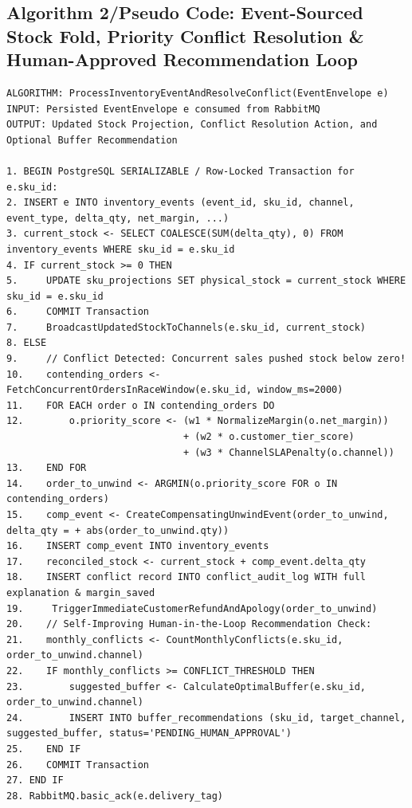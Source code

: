 \documentclass[oneside,a4paper,12pt]{report}
\begin{document}
\subsection{Algorithm 2/Pseudo Code: Event-Sourced Stock Fold, Priority Conflict Resolution \& Human-Approved Recommendation Loop}
\begin{lstlisting}[caption={Algorithm 2: Priority Conflict Resolution and Evidence-Based Buffer Advisor (Python + PostgreSQL)}]
ALGORITHM: ProcessInventoryEventAndResolveConflict(EventEnvelope e)
INPUT: Persisted EventEnvelope e consumed from RabbitMQ
OUTPUT: Updated Stock Projection, Conflict Resolution Action, and Optional Buffer Recommendation

1. BEGIN PostgreSQL SERIALIZABLE / Row-Locked Transaction for e.sku_id:
2. INSERT e INTO inventory_events (event_id, sku_id, channel, event_type, delta_qty, net_margin, ...)
3. current_stock <- SELECT COALESCE(SUM(delta_qty), 0) FROM inventory_events WHERE sku_id = e.sku_id
4. IF current_stock >= 0 THEN
5.     UPDATE sku_projections SET physical_stock = current_stock WHERE sku_id = e.sku_id
6.     COMMIT Transaction
7.     BroadcastUpdatedStockToChannels(e.sku_id, current_stock)
8. ELSE
9.     // Conflict Detected: Concurrent sales pushed stock below zero!
10.    contending_orders <- FetchConcurrentOrdersInRaceWindow(e.sku_id, window_ms=2000)
11.    FOR EACH order o IN contending_orders DO
12.        o.priority_score <- (w1 * NormalizeMargin(o.net_margin))
                               + (w2 * o.customer_tier_score)
                               + (w3 * ChannelSLAPenalty(o.channel))
13.    END FOR
14.    order_to_unwind <- ARGMIN(o.priority_score FOR o IN contending_orders)
15.    comp_event <- CreateCompensatingUnwindEvent(order_to_unwind, delta_qty = + abs(order_to_unwind.qty))
16.    INSERT comp_event INTO inventory_events
17.    reconciled_stock <- current_stock + comp_event.delta_qty
18.    INSERT conflict record INTO conflict_audit_log WITH full explanation & margin_saved
19.     TriggerImmediateCustomerRefundAndApology(order_to_unwind)
20.    // Self-Improving Human-in-the-Loop Recommendation Check:
21.    monthly_conflicts <- CountMonthlyConflicts(e.sku_id, order_to_unwind.channel)
22.    IF monthly_conflicts >= CONFLICT_THRESHOLD THEN
23.        suggested_buffer <- CalculateOptimalBuffer(e.sku_id, order_to_unwind.channel)
24.        INSERT INTO buffer_recommendations (sku_id, target_channel, suggested_buffer, status='PENDING_HUMAN_APPROVAL')
25.    END IF
26.    COMMIT Transaction
27. END IF
28. RabbitMQ.basic_ack(e.delivery_tag)
\end{lstlisting}
\end{document}
